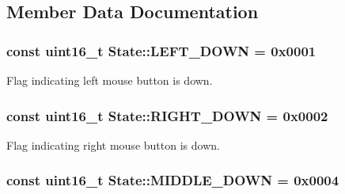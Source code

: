 \subsection{Member Data Documentation}
\hypertarget{structmouse_1_1_state_a4f5eca97c989f6e8eceee194e2121fe8}{
\subsubsection[{L\-E\-F\-T\-\_\-\-D\-O\-W\-N}]{\setlength{\rightskip}{0pt plus 5cm}const uint16\-\_\-t {\bf State\-::\-L\-E\-F\-T\-\_\-\-D\-O\-W\-N} = 0x0001}}\label{structmouse_1_1_state_a4f5eca97c989f6e8eceee194e2121fe8}


Flag indicating left mouse button is down. 

\hypertarget{structmouse_1_1_state_ae07e315484a778beb62c47202be2808f}{
\subsubsection[{R\-I\-G\-H\-T\-\_\-\-D\-O\-W\-N}]{\setlength{\rightskip}{0pt plus 5cm}const uint16\-\_\-t {\bf State\-::\-R\-I\-G\-H\-T\-\_\-\-D\-O\-W\-N} = 0x0002}}\label{structmouse_1_1_state_ae07e315484a778beb62c47202be2808f}


Flag indicating right mouse button is down. 

\hypertarget{structmouse_1_1_state_ad6aff6557abd8a018d1c57d9fd224d85}{
\subsubsection[{M\-I\-D\-D\-L\-E\-\_\-\-D\-O\-W\-N}]{\setlength{\rightskip}{0pt plus 5cm}const uint16\-\_\-t {\bf State\-::\-M\-I\-D\-D\-L\-E\-\_\-\-D\-O\-W\-N} = 0x0004}}\label{structmouse_1_1_state_ad6aff6557abd8a018d1c57d9fd224d85}


